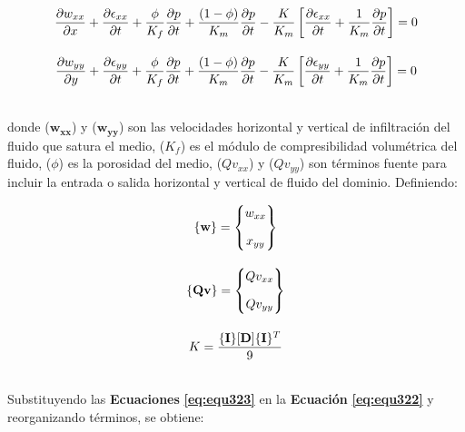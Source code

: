 \begin{ceqn} 
\begin{subequations} \label{eq:equ322} 
\begin{gather}
\normalsize{
\frac{\partial w_{xx}}{\partial x} + \frac{\partial \epsilon_{xx}}{\partial t} + \frac{\phi}{K_f}\frac{\partial p}{\partial t} + \frac{(1-\phi)}{K_m}\frac{\partial p}{\partial t} - \frac{K}{K_m}\left[\frac{\partial \epsilon_{xx}}{\partial t} + \frac{1}{K_m}\frac{\partial p}{\partial t}\right]= 0
} \label{eq:equ322a}\\[10pt]
\normalsize{
\frac{\partial w_{yy}}{\partial y} + \frac{\partial \epsilon_{yy}}{\partial t} + \frac{\phi}{K_f}\frac{\partial p}{\partial t} + \frac{(1-\phi)}{K_m}\frac{\partial p}{\partial t} - \frac{K}{K_m}\left[\frac{\partial \epsilon_{yy}}{\partial t} + \frac{1}{K_m}\frac{\partial p}{\partial t}\right] = 0
} \label{eq:equ322b}
\end{gather}  
\end{subequations} 
\end{ceqn}
\\
donde ($\mathbf{w_{xx}}$) y ($\mathbf{w_{yy}}$) son las velocidades horizontal y vertical de infiltración del fluido que satura el medio, ($K_f$) es el módulo de compresibilidad volumétrica del fluido, ($\phi$) es la porosidad del medio, ($Qv_{xx}$) y ($Qv_{yy}$) son términos fuente para incluir la entrada o salida horizontal y vertical de fluido del dominio. Definiendo:

\begin{ceqn} 
\begin{subequations} \label{eq:equ323} 
\begin{gather}
\normalsize{\{\mathbf{w}\} = \begin{Bmatrix} w_{xx}\\[1em]x_{yy}\end{Bmatrix} } \label{eq:equ323a}\\[10pt]
\normalsize{\{\mathbf{Qv}\} = \begin{Bmatrix} Qv_{xx}\\[1em]Qv_{yy}\end{Bmatrix} } \label{eq:equ323b}\\[10pt]
\normalsize{K = \frac{\{\mathbf{I}\}[\mathbf{D}]\{\mathbf{I}\}^T}{9}}
\end{gather}  
\end{subequations} 
\end{ceqn}
\\
Substituyendo las \textbf{Ecuaciones} \textbf{\ref{eq:equ323}} en la \textbf{Ecuación} \textbf{\ref{eq:equ322}} y reorganizando términos, se obtiene:

